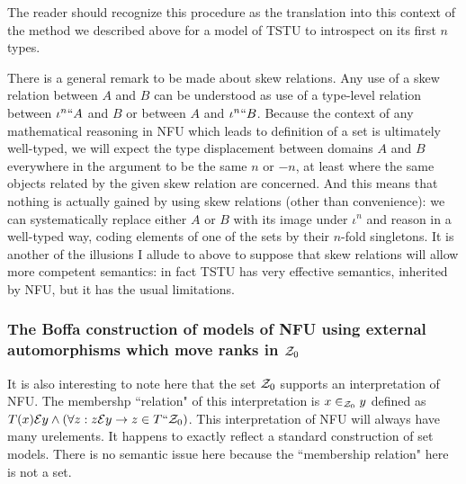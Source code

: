 \documentclass[12pt]{article}
\begin{document}
The reader should recognize this procedure as the translation into this context of the method we described above for a model of TSTU to introspect on its first $n$ types.

There is a general remark to be made about skew relations.  Any use of a skew relation between $A$ and $B$ can be understood as use of a type-level relation between $\iota^n``A$ and $B$ or between $A$ and $\iota^n``B$.
Because the context of any mathematical reasoning in NFU which leads to definition of a set is ultimately well-typed, we will expect the type displacement between domains $A$ and $B$ everywhere in the argument to be the same
$n$ or $-n$, at least where the same objects related by the given skew relation are concerned.  And this means that nothing is actually gained by using skew relations (other than convenience):  we can systematically
replace either $A$ or $B$ with its image under $\iota^n$ and reason in a well-typed way, coding elements of one of the sets by their $n$-fold singletons.  It is another of the illusions I allude to above to suppose that skew relations will allow more competent semantics:  in fact TSTU has very effective semantics, inherited by NFU, but it has the usual limitations.

\subsubsection{The Boffa construction of models of NFU using external automorphisms which move ranks in ${\cal Z}_0$}

It is also interesting to note here that the set ${\cal Z}_0$ supports an interpretation of NFU.  The membershp ``relation" of this interpretation is $x \in_{{\cal Z}_0} y$ defined as $T(x) {\cal E} y \wedge (\forall z:z {\cal E} y \rightarrow z \in T``{{\cal Z}_0})$.  This interpretation of NFU will always have many urelements.  It happens to exactly reflect a standard construction of set models.  There is no semantic issue here because the ``membership relation" here is not a set.
\end{document}
